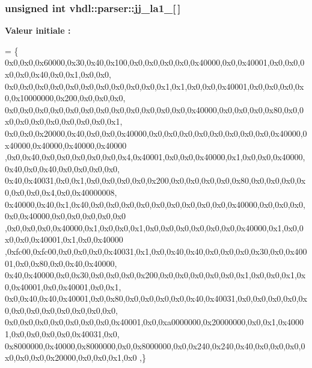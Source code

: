 \subsubsection[{jj\+\_\+la1\+\_\+4}]{\setlength{\rightskip}{0pt plus 5cm}unsigned int vhdl\+::parser\+::jj\+\_\+la1\+\_\mbox{[}$\,$\mbox{]}}\label{namespacevhdl_1_1parser_abf4cc2c3f20ef53df8d9f8d6c5998beb}
{\bfseries Valeur initiale \+:}
\begin{DoxyCode}
= \{
0x0,0x0,0x60000,0x30,0x40,0x100,0x0,0x0,0x0,0x0,0x40000,0x0,0x40001,0x0,0x0,0x0,0x0,0x40,0x0,0x1,0x0,0x0,
      0x0,0x0,0x0,0x0,0x0,0x0,0x0,0x0,0x0,0x0,0x1,0x1,0x0,0x0,0x40001,0x0,0x0,0x0,0x0,0x10000000,0x200,0x0,0x0,0x0,
      0x0,0x0,0x0,0x0,0x0,0x0,0x0,0x0,0x0,0x0,0x0,0x0,0x40000,0x0,0x0,0x0,0x80,0x0,0x0,0x0,0x0,0x0,0x0,0x0,0x0,0x1,
      0x0,0x0,0x20000,0x40,0x0,0x0,0x40000,0x0,0x0,0x0,0x0,0x0,0x0,0x0,0x0,0x40000,0x40000,0x40000,0x40000,0x40000
      ,0x0,0x40,0x0,0x0,0x0,0x0,0x0,0x4,0x40001,0x0,0x0,0x40000,0x1,0x0,0x0,0x40000,0x40,0x0,0x40,0x0,0x0,0x0,0x0,
      0x40,0x40031,0x0,0x1,0x0,0x0,0x0,0x0,0x200,0x0,0x0,0x0,0x0,0x80,0x0,0x0,0x0,0x0,0x0,0x0,0x4,0x0,0x40000008,
      0x40000,0x40,0x1,0x40,0x0,0x0,0x0,0x0,0x0,0x0,0x0,0x0,0x0,0x40000,0x0,0x0,0x0,0x0,0x40000,0x0,0x0,0x0,0x0,0x0
      ,0x0,0x0,0x0,0x40000,0x1,0x0,0x0,0x1,0x0,0x0,0x0,0x0,0x0,0x0,0x40000,0x1,0x0,0x0,0x0,0x40001,0x1,0x0,0x40000
      ,0xfc00,0xfc00,0x0,0x0,0x0,0x40031,0x1,0x0,0x40,0x40,0x0,0x0,0x0,0x30,0x0,0x40001,0x0,0x80,0x0,0x40,0x40000,
      0x40,0x40000,0x0,0x30,0x0,0x0,0x0,0x200,0x0,0x0,0x0,0x0,0x0,0x1,0x0,0x0,0x1,0x0,0x40001,0x0,0x40001,0x0,0x1,
      0x0,0x40,0x40,0x40001,0x0,0x80,0x0,0x0,0x0,0x0,0x40,0x40031,0x0,0x0,0x0,0x0,0x0,0x0,0x0,0x0,0x0,0x0,0x0,0x0,
      0x0,0x0,0x0,0x0,0x0,0x0,0x0,0x40001,0x0,0xa0000000,0x20000000,0x0,0x1,0x40001,0x0,0x0,0x0,0x0,0x40031,0x0,
      0x8000000,0x40000,0x8000000,0x0,0x8000000,0x0,0x240,0x240,0x40,0x0,0x0,0x0,0x0,0x0,0x0,0x20000,0x0,0x0,0x1,0x0
      ,\}
\end{DoxyCode}
\hypertarget{namespacevhdl_1_1parser_a625decea2d793f0d02d0ea61a7d4f12a}{}
